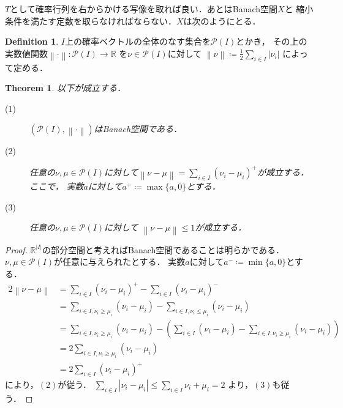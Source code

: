 \documentclass[dvipdfmx,autodetect-engine]{jsarticle}
\newtheorem{theorem}{Theorem}[section]
\theoremstyle{remark}
\theoremstyle{definition}
\newtheorem{definition}{Definition}[section]
\newcommand{\R}{\mathbb{R}}
\newcommand{\abs}[1]{\left\lvert#1\right\rvert}%
\newcommand{\norm}[1]{\left\lVert#1\right\rVert}%
\begin{document}
$T$として確率行列を右からかける写像を取れば良い．あとはBanach空間$X$と
縮小条件を満たす定数を取らなければならない．$X$は次のようにとる．


\begin{definition}
    $I$上の確率ベクトルの全体のなす集合を$\mathcal{P}(I)$とかき，
    その上の実数値関数$\norm{\cdot} \colon \mathcal{P}(I) \to \R$
    を$\nu \in \mathcal{P}(I)$に対して
    $\norm{\nu} \coloneqq \frac{1}{2} \sum_{i \in I}\abs{\nu_{i}}$
    によって定める．
\end{definition}


\begin{theorem}\label{norm_distribution}
    以下が成立する．
    \begin{description}
        \item[(1)] $(\mathcal{P}(I),\norm{\cdot})$はBanach空間である．
        \item[(2)] 任意の$\nu,\mu \in \mathcal{P}(I)$に対して$\norm{\nu - \mu} = 
         \sum_{i \in I} (\nu_{i} - \mu_{i})^{+}$が成立する．ここで，
        実数$a$に対して$a^{+} \coloneqq \max\{a,0\}$とする．
        \item[(3)] 任意の$\nu,\mu \in \mathcal{P}(I)$に対して
        $\norm{\nu - \mu} \leq 1$が成立する．
    \end{description}
\end{theorem}


\begin{proof}
    $\R^{\abs{I}}$の部分空間と考えればBanach空間であることは明らかである．
    $\nu,\mu\in \mathcal{P}(I)$が任意に与えられたとする．
    実数$a$に対して$a^{-} \coloneqq \min\{a,0\}$とする．
    \begin{align}
        2\norm{\nu-\mu} &=  \sum_{i \in I} (\nu_{i} - \mu_{i})^{+} 
        -  \sum_{i \in I} (\nu_{i} - \mu_{i})^{-}\\
        &= \sum_{i \in I, \nu_{i} \geq \mu_{i}} (\nu_{i} - \mu_{i}) 
        - \sum_{i \in I, \nu_{i} \leq \mu_{i}} (\nu_{i} - \mu_{i}) \\
        &= \sum_{i \in I, \nu_{i} \geq \mu_{i}} (\nu_{i} - \mu_{i}) 
        - \left(\sum_{i \in I} (\nu_{i} - \mu_{i})  
        - \sum_{i \in I,\nu_{i} \geq \mu_{i} }(\nu_{i} - \mu_{i}) \right)\\
        &= 2 \sum_{i \in I, \nu_{i} \geq \mu_{i}} (\nu_{i} - \mu_{i}) \\
        &= 2 \sum_{i \in I} (\nu_{i} - \mu_{i})^{+}
    \end{align}
    により，$(2)$が従う．
    $\sum_{i \in I} \abs{\nu_{i} - \mu_{i}} \leq \sum_{i \in I} \nu_{i} + \mu_{i} = 2$
    より，$(3)$も従う．
\end{proof}
\end{document}
